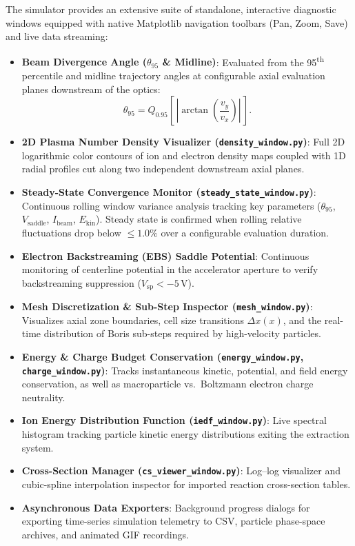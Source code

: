 \documentclass[11pt,a4paper]{article}
\begin{document}
The simulator provides an extensive suite of standalone, interactive diagnostic windows equipped with native Matplotlib navigation toolbars (Pan, Zoom, Save) and live data streaming:
\begin{itemize}[nosep]
    \item \textbf{Beam Divergence Angle ($\theta_{95}$ \& Midline)}: Evaluated from the 95\textsuperscript{th} percentile and midline trajectory angles at configurable axial evaluation planes downstream of the optics:
    \begin{equation}
        \theta_{95} = Q_{0.95}\!\left[\,\left|\arctan\left(\frac{v_y}{v_x}\right)\right|\,\right].
    \end{equation}
    \item \textbf{2D Plasma Number Density Visualizer (\texttt{density\_window.py})}: Full 2D logarithmic color contours of ion and electron density maps coupled with 1D radial profiles cut along two independent downstream axial planes.
    \item \textbf{Steady-State Convergence Monitor (\texttt{steady\_state\_window.py})}: Continuous rolling window variance analysis tracking key parameters ($\theta_{95}$, $V_{\mathrm{saddle}}$, $I_{\mathrm{beam}}$, $E_{\mathrm{kin}}$). Steady state is confirmed when rolling relative fluctuations drop below $\le 1.0\%$ over a configurable evaluation duration.
    \item \textbf{Electron Backstreaming (EBS) Saddle Potential}: Continuous monitoring of centerline potential in the accelerator aperture to verify backstreaming suppression ($V_{\mathrm{sp}} < -5\,\si{\volt}$).
    \item \textbf{Mesh Discretization \& Sub-Step Inspector (\texttt{mesh\_window.py})}: Visualizes axial zone boundaries, cell size transitions $\Delta x(x)$, and the real-time distribution of Boris sub-steps required by high-velocity particles.
    \item \textbf{Energy \& Charge Budget Conservation (\texttt{energy\_window.py}, \texttt{charge\_window.py})}: Tracks instantaneous kinetic, potential, and field energy conservation, as well as macroparticle vs.\ Boltzmann electron charge neutrality.
    \item \textbf{Ion Energy Distribution Function (\texttt{iedf\_window.py})}: Live spectral histogram tracking particle kinetic energy distributions exiting the extraction system.
    \item \textbf{Cross-Section Manager (\texttt{cs\_viewer\_window.py})}: Log--log visualizer and cubic-spline interpolation inspector for imported reaction cross-section tables.
    \item \textbf{Asynchronous Data Exporters}: Background progress dialogs for exporting time-series simulation telemetry to CSV, particle phase-space archives, and animated GIF recordings.
\end{itemize}
\end{document}
